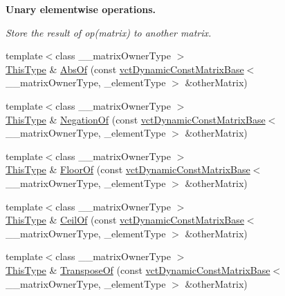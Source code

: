 \begin{Indent}{\bf Unary elementwise operations.}\par
{\em Store the result of op(matrix) to another matrix. }\begin{DoxyCompactItemize}
\item 
{\footnotesize template$<$class \-\_\-\-\_\-matrix\-Owner\-Type $>$ }\\\hyperlink{classvct_dynamic_const_matrix_base_ac4ff48cbe4d9de3fdef5a02447ffb9db}{This\-Type} \& \hyperlink{classvct_dynamic_matrix_base_a16665be39341b53c42ad7068cf71fa92}{Abs\-Of} (const \hyperlink{classvct_dynamic_const_matrix_base}{vct\-Dynamic\-Const\-Matrix\-Base}$<$ \-\_\-\-\_\-matrix\-Owner\-Type, \-\_\-element\-Type $>$ \&other\-Matrix)
\item 
{\footnotesize template$<$class \-\_\-\-\_\-matrix\-Owner\-Type $>$ }\\\hyperlink{classvct_dynamic_const_matrix_base_ac4ff48cbe4d9de3fdef5a02447ffb9db}{This\-Type} \& \hyperlink{classvct_dynamic_matrix_base_a7252cdf3d1df1283275b08c2adf43a80}{Negation\-Of} (const \hyperlink{classvct_dynamic_const_matrix_base}{vct\-Dynamic\-Const\-Matrix\-Base}$<$ \-\_\-\-\_\-matrix\-Owner\-Type, \-\_\-element\-Type $>$ \&other\-Matrix)
\item 
{\footnotesize template$<$class \-\_\-\-\_\-matrix\-Owner\-Type $>$ }\\\hyperlink{classvct_dynamic_const_matrix_base_ac4ff48cbe4d9de3fdef5a02447ffb9db}{This\-Type} \& \hyperlink{classvct_dynamic_matrix_base_acd8d8f4a2697c2493859604599a323a4}{Floor\-Of} (const \hyperlink{classvct_dynamic_const_matrix_base}{vct\-Dynamic\-Const\-Matrix\-Base}$<$ \-\_\-\-\_\-matrix\-Owner\-Type, \-\_\-element\-Type $>$ \&other\-Matrix)
\item 
{\footnotesize template$<$class \-\_\-\-\_\-matrix\-Owner\-Type $>$ }\\\hyperlink{classvct_dynamic_const_matrix_base_ac4ff48cbe4d9de3fdef5a02447ffb9db}{This\-Type} \& \hyperlink{classvct_dynamic_matrix_base_ac5332599950a05e2f87bd1d94798adba}{Ceil\-Of} (const \hyperlink{classvct_dynamic_const_matrix_base}{vct\-Dynamic\-Const\-Matrix\-Base}$<$ \-\_\-\-\_\-matrix\-Owner\-Type, \-\_\-element\-Type $>$ \&other\-Matrix)
\item 
{\footnotesize template$<$class \-\_\-\-\_\-matrix\-Owner\-Type $>$ }\\\hyperlink{classvct_dynamic_const_matrix_base_ac4ff48cbe4d9de3fdef5a02447ffb9db}{This\-Type} \& \hyperlink{classvct_dynamic_matrix_base_a232c2b58e0cb3535090e8810f9e5860b}{Transpose\-Of} (const \hyperlink{classvct_dynamic_const_matrix_base}{vct\-Dynamic\-Const\-Matrix\-Base}$<$ \-\_\-\-\_\-matrix\-Owner\-Type, \-\_\-element\-Type $>$ \&other\-Matrix)
\end{DoxyCompactItemize}
\end{Indent}
